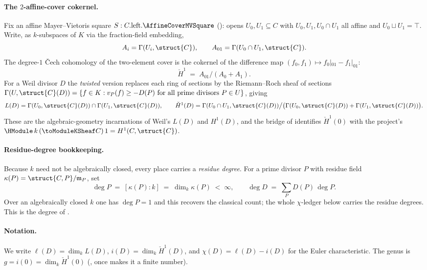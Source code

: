 \paragraph{The \(2\)-affine-cover cokernel.}
Fix an affine Mayer--Vietoris square
\(S : C.\mathrm{left}.\AffineCoverMVSquare\) ():
opens \(U_0, U_1 \subseteq C\) with \(U_0, U_1, U_0 \cap U_1\) all affine
and \(U_0 \sqcup U_1 = \top\). Write, as \(k\)-subspaces of \(K\) via the
fraction-field embedding,
\[
  A_i = \Gamma(U_i, \struct{C}), \qquad
  A_{01} = \Gamma(U_0 \cap U_1, \struct{C}).
\]
The degree-\(1\) Čech cohomology of the two-element cover is the cokernel
of the difference map \((f_0, f_1) \mapsto f_0|_{01} - f_1|_{01}\):
\[
  \check{H}^1 \;=\; A_{01} \big/ (A_0 + A_1).
\]
For a Weil divisor \(D\) the \emph{twisted} version replaces each ring of
sections by the Riemann--Roch sheaf of sections
\(\Gamma(U, \struct{C}(D)) = \{ f \in K : v_P(f) \ge -D(P) \text{ for all
prime divisors } P \in U\}\), giving
\[
  L(D) = \Gamma(U_0, \struct{C}(D)) \cap \Gamma(U_1, \struct{C}(D)),
  \qquad
  \check{H}^1(D) = \Gamma(U_0 \cap U_1, \struct{C}(D)) \big/
    \bigl(\Gamma(U_0, \struct{C}(D)) + \Gamma(U_1, \struct{C}(D))\bigr).
\]
These are the algebraic-geometry incarnations of Weil's \(L(D)\) and
\(H^1(D)\), and the bridge of 
identifies \(\check{H}^1(0)\) with the project's
\(\HModule\, k\, (\toModuleKSheaf C)\, 1 = H^1(C, \struct{C})\).

\paragraph{Residue-degree bookkeeping.}
Because \(k\) need not be algebraically closed, every place carries a
\emph{residue degree}. For a prime divisor \(P\) with residue field
\(\kappa(P) = \struct{C, P}/\mathfrak{m}_P\), set
\[
  \deg P \;=\; [\kappa(P) : k] \;=\; \dim_k \kappa(P) \;<\; \infty,
  \qquad
  \deg D \;=\; \sum_P D(P)\,\deg P .
\]
Over an algebraically closed \(k\) one has \(\deg P = 1\) and this
recovers the classical count; the whole \(\chi\)-ledger below carries the
residue degrees. This is the degree of
.

\paragraph{Notation.} We write \(\ell(D) = \dim_k L(D)\),
\(i(D) = \dim_k \check{H}^1(D)\), and
\(\chi(D) = \ell(D) - i(D)\) for the Euler characteristic. The genus is
\(g = i(0) = \dim_k \check{H}^1(0)\) (, once
 makes it a finite number).


